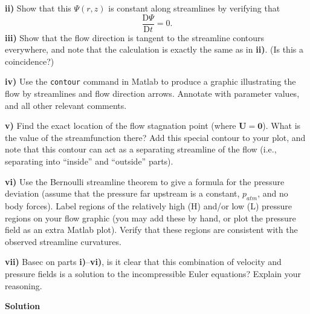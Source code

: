 \documentclass{article}
\def\*#1{\mathbf{#1}}
\newcommand{\dadvd}[2]{\dfrac{\text{D} #1}{\text{D} #2}} %
\begin{document}
\textbf{ii)} Show that this $\Psi(r, z)$ is constant along streamlines
by verifying that
%
\begin{equation*}
    \dadvd{\Psi}{t} = 0
    .
\end{equation*}
%
\textbf{iii)} Show that the flow direction is tangent to the streamline
contours everywhere, and note that the calculation is exactly the same
as in \textbf{ii)}. (Is this a coincidence?)

\textbf{iv)} Use the \texttt{contour} command in Matlab to produce a
graphic illustrating the flow by streamlines and flow direction arrows.
Annotate with parameter values, and all other relevant comments.

\textbf{v)} Find the exact location of the flow stagnation point (where
$\*U = \*0$). What is the value of the streamfunction there? Add this
special contour to your plot, and note that this contour can act as a
separating streamline of the flow (i.e., separating into ``inside'' and
``outside'' parts).

\textbf{vi)} Use the Bernoulli streamline theorem to give a formula for
the pressure deviation (assume that the pressure far upstream is a
constant, $p_{atm}$, and no body forces). Label regions of the
relatively high (H) and/or low (L) pressure regions on your flow graphic
(you may add these by hand, or plot the pressure field as an extra
Matlab plot). Verify that these regions are consistent with the observed
streamline curvatures.

\textbf{vii)} Basec on parts \textbf{i)}--\textbf{vi)}, is it clear that
this combination of velocity and pressure fields is a solution to the
incompressible Euler equations? Explain your reasoning.

\newpage

\textbf{Solution}
\end{document}
